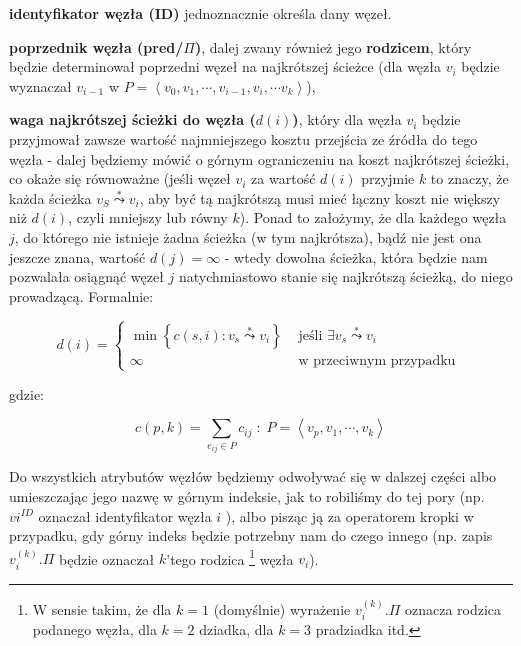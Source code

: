 \begin{myitemize}

\item \textbf{identyfikator węzła (ID)} jednoznacznie określa dany węzeł.

\item \textbf{poprzednik węzła (pred/$\Pi$)}, dalej zwany również jego \textbf{rodzicem}, który będzie determinował poprzedni węzeł na najkrótszej ścieżce (dla węzła $v_{i}$ będzie wyznaczał $v_{i-1}$ w $P = \left \langle v_{0}, v_{1}, \cdots, v_{i-1}, v_{i}, \cdots v_{k} \right \rangle $),

\item \textbf{waga najkrótszej ścieżki do węzła ($d \left( i \right) $)}, który dla węzła $v_{i}$ będzie przyjmował zawsze wartość najmniejszego kosztu przejścia ze źródła do tego węzła - dalej będziemy mówić o górnym ograniczeniu na koszt najkrótszej ścieżki, co okaże się równoważne (jeśli węzeł $v_{i}$ za wartość $ d \left( i \right) $ przyjmie $k$ to znaczy, że każda ścieżka $v_{S} \overset{*}\leadsto v_{i}$, aby być tą najkrótszą musi mieć łączny koszt nie większy niż $ d \left( i \right) $, czyli mniejszy lub równy $k$). Ponad to założymy, że dla każdego węzła $j$, do którego nie istnieje żadna ścieżka (w tym najkrótsza), bądź nie jest ona jeszcze znana, wartość $d \left( j \right) = \infty$ - wtedy dowolna ścieżka, która będzie nam pozwalała osiągnąć węzeł $j$ natychmiastowo stanie się najkrótszą ścieżką, do niego prowadzącą. Formalnie:

\begin{equation}
	d \left ( i \right ) = 
	\begin{cases}
	 \min \left\{ c \left( s,i \right ) : v_{s} \overset{*}\leadsto v_{i} \right\} & \text{ jeśli } \exists v_{s} \overset{*}\leadsto v_{i} \\ 
	 \infty & \text{ w przeciwnym przypadku }
	\end{cases}
\end{equation}

gdzie:

\begin{equation}
c \left( p,k \right ) = \sum_{e_{ij} \in P} c_{ij} \; : \; P = \left \langle v_{p}, v_{1}, \cdots, v_{k} \right \rangle 
\end{equation}

\end{myitemize}

Do wszystkich atrybutów węzłów będziemy odwoływać się w dalszej części albo umieszczając jego nazwę w górnym indeksie, jak to robiliśmy do tej pory (np. $v{i}^{ID}$ oznaczał identyfikator węzła $i$ ), albo pisząc ją za operatorem kropki w przypadku, gdy górny indeks będzie potrzebny nam do czego innego (np. zapis $v_{i}^{ \left( k \right) }.\Pi$ będzie oznaczał $k$'tego rodzica \footnote{W sensie takim, że dla $k=1$ (domyślnie) wyrażenie $v_{i}^{ \left( k \right) }.\Pi$ oznacza rodzica podanego węzła, dla $k=2$ dziadka, dla $k=3$ pradziadka itd.} węzła $v_{i}$).

